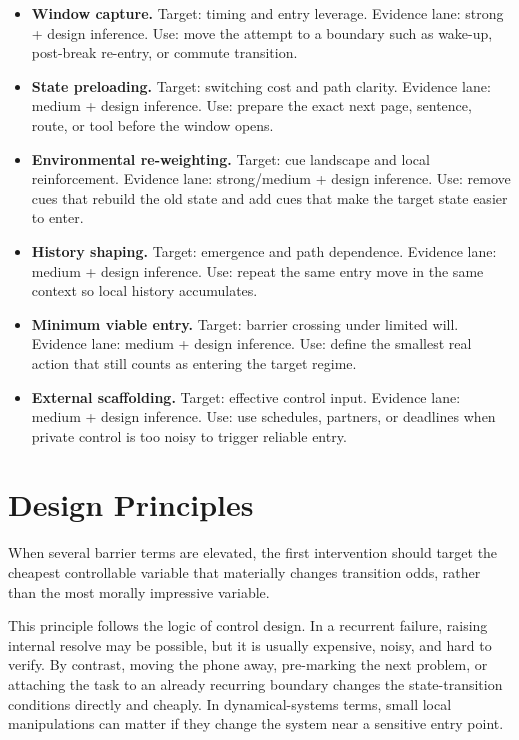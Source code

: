 \begin{itemize}[nosep]
  \item \textbf{Window capture.} Target: timing and entry leverage.
        Evidence lane: strong + design inference.
        Use: move the attempt to a boundary such as wake-up, post-break
        re-entry, or commute transition.
  \item \textbf{State preloading.} Target: switching cost and path clarity.
        Evidence lane: medium + design inference.
        Use: prepare the exact next page, sentence, route, or tool before the
        window opens.
  \item \textbf{Environmental re-weighting.} Target: cue landscape and local
        reinforcement.
        Evidence lane: strong/medium + design inference.
        Use: remove cues that rebuild the old state and add cues that make the
        target state easier to enter.
  \item \textbf{History shaping.} Target: emergence and path dependence.
        Evidence lane: medium + design inference.
        Use: repeat the same entry move in the same context so local history
        accumulates.
  \item \textbf{Minimum viable entry.} Target: barrier crossing under limited
        will.
        Evidence lane: medium + design inference.
        Use: define the smallest real action that still counts as entering the
        target regime.
  \item \textbf{External scaffolding.} Target: effective control input.
        Evidence lane: medium + design inference.
        Use: use schedules, partners, or deadlines when private control is too
        noisy to trigger reliable entry.
\end{itemize}

\section{Design Principles}

\begin{proposition}
When several barrier terms are elevated, the first intervention should target
the cheapest controllable variable that materially changes transition odds,
rather than the most morally impressive variable.
\end{proposition}

\begin{discussion}
This principle follows the logic of control design. In a recurrent failure,
raising internal resolve may be possible, but it is usually expensive, noisy,
and hard to verify. By contrast, moving the phone away, pre-marking the next
problem, or attaching the task to an already recurring boundary changes the
state-transition conditions directly and cheaply. In dynamical-systems terms,
small local manipulations can matter if they change the system near a sensitive
entry point.
\end{discussion}

